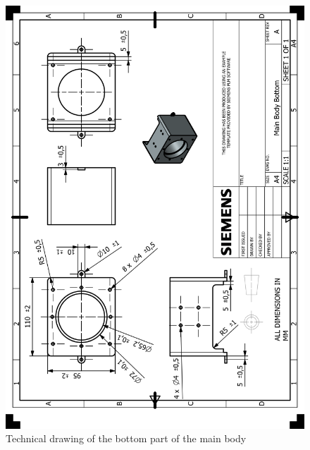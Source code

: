 \documentclass[12pt]{article}
\begin{document}
\begin{appendices}
\begin{figure}[H]
    \centering
    \includegraphics[width=\textwidth]{HP_Main Body Bottom.png} 
    \caption{Technical drawing of the bottom part of the main body}
    \label{fig:technical-drawing}
\end{figure}


\end{appendices}
\end{document}
